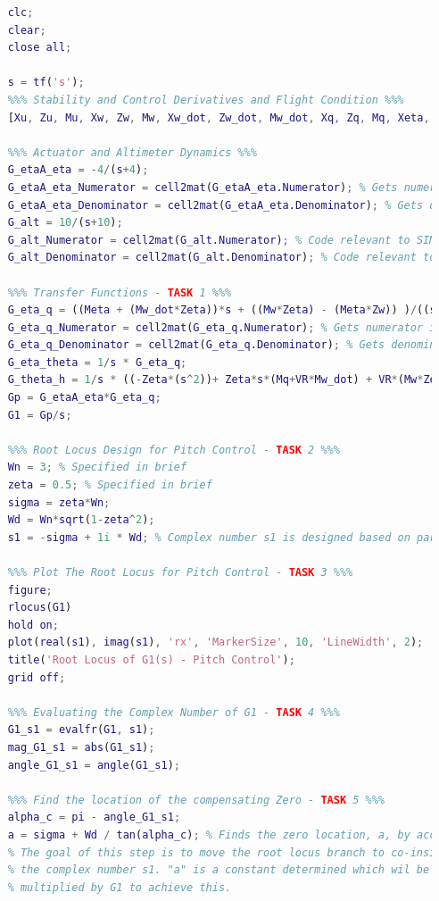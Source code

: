 \documentclass[stu, a4paper, 12pt, floatsintext]{apa7}
\numberwithin{figure}{section}
\numberwithin{table}{section}
\numberwithin{equation}{section}
\begin{document}
\begin{lstlisting}[language=MATLAB]
    %%% Workspace Cleanup %%%
    clc;
    clear;
    close all;
    
    s = tf('s');
    %%% Stability and Control Derivatives and Flight Condition %%%
    [Xu, Zu, Mu, Xw, Zw, Mw, Xw_dot, Zw_dot, Mw_dot, Xq, Zq, Mq, Xeta, Zeta, Meta, VR, g] = final_assignment_variables(); % Change the name of this function to to run this system with different variable values.
    
    %%% Actuator and Altimeter Dynamics %%%
    G_etaA_eta = -4/(s+4);
    G_etaA_eta_Numerator = cell2mat(G_etaA_eta.Numerator); % Gets numerator in appropriate form for Simulink
    G_etaA_eta_Denominator = cell2mat(G_etaA_eta.Denominator); % Gets denominator in appropriate form for Simulink
    G_alt = 10/(s+10);
    G_alt_Numerator = cell2mat(G_alt.Numerator); % Code relevant to SIMULINK
    G_alt_Denominator = cell2mat(G_alt.Denominator); % Code relevant to SIMULINK
    
    %%% Transfer Functions - TASK 1 %%% 
    G_eta_q = ((Meta + (Mw_dot*Zeta))*s + ((Mw*Zeta) - (Meta*Zw)) )/((s^2) - ((VR*Mw_dot) + Zw + Mq)*s +((Mq*Zw) - (VR*Mw)));
    G_eta_q_Numerator = cell2mat(G_eta_q.Numerator); % Gets numerator in appropriate form for Simulink
    G_eta_q_Denominator = cell2mat(G_eta_q.Denominator); % Gets denominator in appropriate form for Simulink
    G_eta_theta = 1/s * G_eta_q;
    G_theta_h = 1/s * ((-Zeta*(s^2))+ Zeta*s*(Mq+VR*Mw_dot) + VR*(Mw*Zeta-Meta*Zw))/(s*(Meta+Mw_dot*Zeta) + (Mw*Zeta-Meta*Zw));
    Gp = G_etaA_eta*G_eta_q;
    G1 = Gp/s;
    
    %%% Root Locus Design for Pitch Control - TASK 2 %%%
    Wn = 3; % Specified in brief
    zeta = 0.5; % Specified in brief
    sigma = zeta*Wn;
    Wd = Wn*sqrt(1-zeta^2);
    s1 = -sigma + 1i * Wd; % Complex number s1 is designed based on parameters decided in the brief. This complex is used as a design goal for G2
    
    %%% Plot The Root Locus for Pitch Control - TASK 3 %%%
    figure;
    rlocus(G1)
    hold on;
    plot(real(s1), imag(s1), 'rx', 'MarkerSize', 10, 'LineWidth', 2);
    title('Root Locus of G1(s) - Pitch Control');
    grid off;
    
    %%% Evaluating the Complex Number of G1 - TASK 4 %%%
    G1_s1 = evalfr(G1, s1);
    mag_G1_s1 = abs(G1_s1);
    angle_G1_s1 = angle(G1_s1);
    
    %%% Find the location of the compensating Zero - TASK 5 %%%
    alpha_c = pi - angle_G1_s1;
    a = sigma + Wd / tan(alpha_c); % Finds the zero location, a, by accounting for the phase shortfall at point s1. 
    % The goal of this step is to move the root locus branch to co-inside with
    % the complex number s1. "a" is a constant determined which wil be
    % multiplied by G1 to achieve this.
    

\end{lstlisting}
\end{document}

